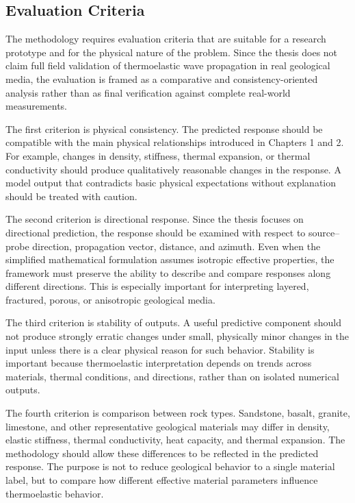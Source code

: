 \subsection{Evaluation Criteria}

The methodology requires evaluation criteria that are suitable for a research prototype and for the physical nature of the problem. Since the thesis does not claim full field validation of thermoelastic wave propagation in real geological media, the evaluation is framed as a comparative and consistency-oriented analysis rather than as final verification against complete real-world measurements.

The first criterion is physical consistency. The predicted response should be compatible with the main physical relationships introduced in Chapters 1 and 2. For example, changes in density, stiffness, thermal expansion, or thermal conductivity should produce qualitatively reasonable changes in the response. A model output that contradicts basic physical expectations without explanation should be treated with caution.

The second criterion is directional response. Since the thesis focuses on directional prediction, the response should be examined with respect to source--probe direction, propagation vector, distance, and azimuth. Even when the simplified mathematical formulation assumes isotropic effective properties, the framework must preserve the ability to describe and compare responses along different directions. This is especially important for interpreting layered, fractured, porous, or anisotropic geological media.

The third criterion is stability of outputs. A useful predictive component should not produce strongly erratic changes under small, physically minor changes in the input unless there is a clear physical reason for such behavior. Stability is important because thermoelastic interpretation depends on trends across materials, thermal conditions, and directions, rather than on isolated numerical outputs.

The fourth criterion is comparison between rock types. Sandstone, basalt, granite, limestone, and other representative geological materials may differ in density, elastic stiffness, thermal conductivity, heat capacity, and thermal expansion. The methodology should allow these differences to be reflected in the predicted response. The purpose is not to reduce geological behavior to a single material label, but to compare how different effective material parameters influence thermoelastic behavior.

